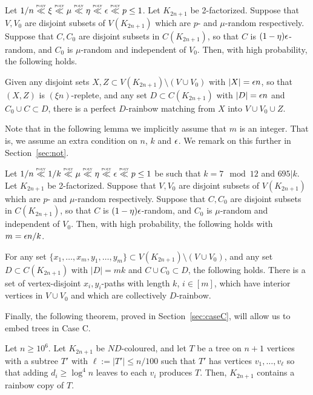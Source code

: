 \begin{lemma}\label{lem:finishA} Let $1/n\ll \xi\ll \mu \ll \eta \ll\eps\ll p\leq 1$. Let $K_{2n+1}$ be 2-factorized. Suppose that $V,V_0$ are disjoint subsets of $V(K_{2n+1})$ which are $p$- and $\mu$-random respectively. Suppose that $C,C_0$ are disjoint subsets in $C(K_{2n+1})$, so that $C$ is $(1-\eta)\epsilon$-random, and
$C_0$ is $\mu$-random and independent of $V_0$. Then, with high probability, the following holds.

Given any disjoint sets $X,Z\subset V(K_{2n+1})\setminus (V\cup V_0)$ with $|X|=\epsilon n$, so that $(X,Z)$ is $(\xi n)$-replete, and any set $D\subset C(K_{2n+1})$ with $|D|=\epsilon n$ and $C_0\cup C\subset D$, there is a perfect $D$-rainbow matching from $X$ into $V\cup V_0\cup Z$.
\end{lemma}
Note that in the following lemma we implicitly assume that $m$ is an integer. That is, we assume an extra condition on $n$, $k$ and $\epsilon$. We remark on this further in Section~\ref{sec:not}.
\begin{lemma}\label{lem:finishB} Let $1/n\ll  1/k\ll \mu\ll \eta \ll\eps\ll p\leq 1$ be such that $k = 7\mod 12$ and $695|k$. Let $K_{2n+1}$ be 2-factorized. Suppose that $V,V_0$ are disjoint subsets of $V(K_{2n+1})$ which are $p$- and $\mu$-random respectively. Suppose that $C,C_0$ are disjoint subsets in $C(K_{2n+1})$, so that $C$ is $(1-\eta)\epsilon$-random, and $C_0$ is $\mu$-random and independent of $V_0$. Then, with high probability, the following holds with $m=\epsilon n/k$.

For any set $\{x_1,\ldots,x_m,y_1,\ldots,y_m\}\subset V(K_{2n+1})\setminus (V\cup V_0)$, and any set $D\subset C(K_{2n+1})$ with $|D|=mk$ and $C\cup C_0\subset D$, the following holds. There is a set of vertex-disjoint $x_i,y_i$-paths with length $k$, $i\in [m]$, which have interior vertices in $V\cup V_0$ and which are collectively $D$-rainbow.
\end{lemma}

Finally, the following theorem, proved in Section~\ref{sec:caseC}, will allow us to embed trees in Case C.
\begin{theorem}\label{Theorem_case_C}
Let $n\geq 10^6$. Let $K_{2n+1}$ be $ND$-coloured, and let $T$ be a tree on $n+1$ vertices with a subtree $T'$ with $\ell:=|T'|\leq n/100$ such that $T'$ has vertices $v_1, \dots, v_{\ell}$ so that adding $d_i\geq \log^4n$ leaves to each $v_i$ produces $T$.
Then, $K_{2n+1}$ contains a rainbow copy of $T$.
\end{theorem}

